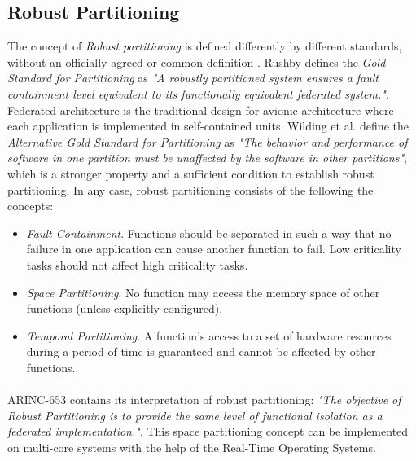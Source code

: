 \subsection{Robust Partitioning} 
The concept of \emph{Robust partitioning} is defined differently by different standards, without an officially agreed or common definition \cite{robustpartitioning}. Rushby \cite{goldenrule} defines the \emph{Gold Standard for Partitioning} as \emph{"A robustly partitioned system ensures a fault containment level equivalent to its functionally equivalent federated system."}. Federated architecture is the traditional design for avionic architecture where each application is implemented in self-contained units. Wilding et al.\cite{goldenruleinvariant} define the \emph{Alternative Gold Standard for Partitioning} as \emph{"The behavior and performance of software in one partition must be unaffected by the software in other partitions"}, which is a stronger property and a sufficient condition to establish robust partitioning. In any case, robust partitioning consists of the following the concepts:
\begin{itemize}
\item \emph{Fault Containment}. Functions should be separated in such a way that no failure in one application can cause another function to fail. Low criticality tasks should not affect high criticality tasks.
\item \emph{Space Partitioning}. No function may access the memory space of other functions (unless explicitly configured).
\item \emph{Temporal Partitioning}. A function's access to a set of hardware resources during a period of time is guaranteed and cannot be affected by other functions..
\end{itemize}

\paragraph{} ARINC-653 contains its interpretation of robust partitioning: \emph{"The objective of Robust Partitioning is to provide the same level of functional isolation as a federated implementation."}. This space partitioning concept can be implemented on multi-core systems with the help of the Real-Time Operating Systems.

